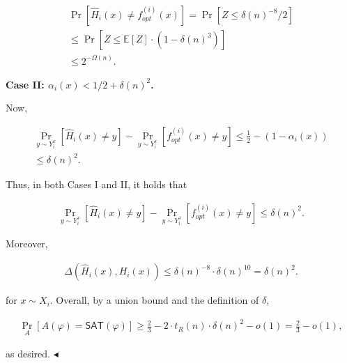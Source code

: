 \[\begin{gathered}
\displaystyle\Pr\left[\hat{H}_{i}(x)\neq f_{opt}^{(i)}(x)\right] \displaystyle=\Pr\left[Z\leq\delta(n)^{-8}/2\right] \\
\displaystyle\leq\Pr\left[Z\leq\mathbb{E}[Z]\cdot(1-\delta(n)^{3})\right] \\
\displaystyle\leq 2^{-\Omega(n)}.
\end{gathered}\]





\par\medskip\noindent\textbf{Case II: $\alpha_{i}(x)<1/2+\delta(n)^{2}$.}\par




Now,\par


\[\begin{gathered}
\displaystyle\Pr_{y\sim Y_{i}^{x}}[\hat{H}_{i}(x)\neq y]-\Pr_{y\sim Y_{i}^{x}}[f_{opt}^{(i)}(x)\neq y] \displaystyle\leq\frac{1}{2}-(1-\alpha_{i}(x)) \\
\displaystyle\leq\delta(n)^{2}.
\end{gathered}\]




Thus, in both Cases I and II, it holds that\par


\[\begin{gathered}
\Pr_{y\sim Y_{i}^{x}}[\hat{H}_{i}(x)\neq y]-\Pr_{y\sim Y_{i}^{x}}[f_{opt}^{(i)}(x)\neq y]\leq\delta(n)^{2}.
\end{gathered}\]


Moreover,\par


\[\begin{gathered}
\Delta(\hat{H}_{i}(x),H_{i}(x))\leq\delta(n)^{-8}\cdot\delta(n)^{10}=\delta(n)^{2}.
\end{gathered}\]


for $x\sim X_{i}$. Overall, by a union bound and the definition of $\delta$,\par


\[\begin{gathered}
\Pr_{A}[A(\varphi)={\mathsf{SAT}}(\varphi)]\geq\frac{2}{3}-2\cdot t_{R}(n)\cdot\delta(n)^{2}-o(1)=\frac{2}{3}-o(1),
\end{gathered}\]


as desired.
$\blacktriangleleft$\par




